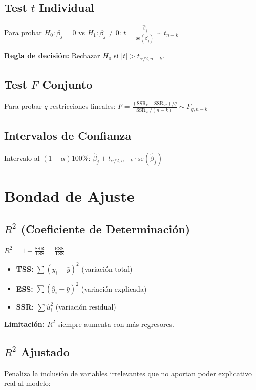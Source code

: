 \documentclass[9pt, spanish, twoside]{article}
\newcommand{\critical}[1]{\textcolor{CriticalRed}{\textbf{#1}}}
\newcommand{\eqbox}[1]{\colorbox{TitaniumGray}{$\displaystyle #1$}}
\begin{document}
\begin{multicols*}{3}
\subsection{Test $t$ Individual}
Para probar $H_0: \beta_j = 0$ vs $H_1: \beta_j \neq 0$:
\eqbox{t = \frac{\hat{\beta}_j}{\text{se}(\hat{\beta}_j)} \sim t_{n-k}}

\critical{Regla de decisión:} Rechazar $H_0$ si $|t| > t_{\alpha/2, n-k}$.

\subsection{Test $F$ Conjunto}
Para probar $q$ restricciones lineales:
\eqbox{F = \frac{(\text{SSR}_r - \text{SSR}_{ur})/q}{\text{SSR}_{ur}/(n-k)} \sim F_{q, n-k}}

\subsection{Intervalos de Confianza}
Intervalo al $(1-\alpha)100\%$:
\eqbox{\hat{\beta}_j \pm t_{\alpha/2, n-k} \cdot \text{se}(\hat{\beta}_j)}

\section{Bondad de Ajuste}
\subsection{$R^2$ (Coeficiente de Determinación)}
\eqbox{R^2 = 1 - \frac{\text{SSR}}{\text{TSS}} = \frac{\text{ESS}}{\text{TSS}}}

\begin{itemize}[leftmargin=8pt, noitemsep, topsep=2pt]
    \item \textbf{TSS:} $\sum(y_i - \bar{y})^2$ (variación total)
    \item \textbf{ESS:} $\sum(\hat{y}_i - \bar{y})^2$ (variación explicada)
    \item \textbf{SSR:} $\sum\hat{u}_i^2$ (variación residual)
\end{itemize}

\critical{Limitación:} $R^2$ siempre aumenta con más regresores.

\subsection{$R^2$ Ajustado}
Penaliza la inclusión de variables irrelevantes que no aportan poder explicativo real al modelo:


\end{multicols*}
\end{document}
